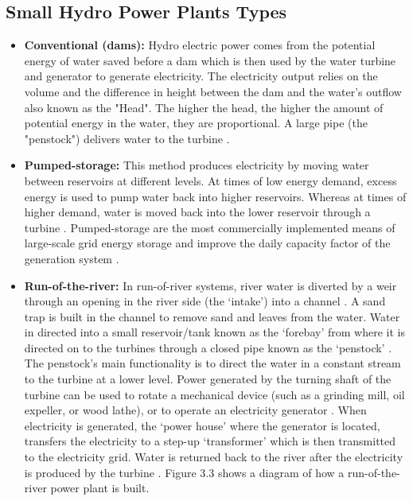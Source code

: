 \subsection{Small Hydro Power Plants Types}
\begin{itemize}
\item \textbf{Conventional (dams):} Hydro electric power comes from the potential energy of water saved before a dam which is then used by the water turbine and generator to generate electricity. The electricity output relies on the volume and the difference in height between the dam and the water's outflow also known as the "Head". The higher the head, the higher the amount of potential energy in the water, they are proportional. A large pipe (the "penstock") delivers water to the turbine \cite{HydroPP}.
\item \textbf{Pumped-storage:} This method produces electricity by moving water between reservoirs at different levels. At times of low energy demand, excess energy is used to pump water back into higher reservoirs. Whereas at times of higher demand, water is moved back into the lower reservoir through a turbine \cite{HydroPP}. Pumped-storage are the most commercially implemented means of large-scale grid energy storage and improve the daily capacity factor of the generation system \cite{HydroPP}.
\item \textbf{Run-of-the-river:} In run-of-river systems, river water is diverted by a weir through an opening in the river side (the ‘intake’) into a channel \cite{HydroPower}. A sand trap is built in the channel to remove sand and leaves from the water. Water in directed into a small reservoir/tank known as the ‘forebay’ from where it is directed on to the turbines through a closed pipe known as the ‘penstock’ \cite{HydroPower}. The penstock's main functionality is to direct the water in a constant stream to the turbine at a lower level. Power generated by the turning shaft of the turbine can be used to rotate a mechanical device (such as a grinding mill, oil expeller, or wood lathe), or to operate an electricity generator \cite{HydroPower}. When electricity is generated, the ‘power house’ where the generator is located, transfers the electricity to a step-up ‘transformer’ which is then transmitted to the electricity grid. Water is returned back to the river after the electricity is produced by the turbine \cite{HydroPower}. Figure 3.3 shows a diagram of how a run-of-the-river power plant is built.


\end{itemize}
